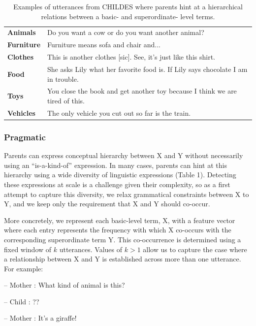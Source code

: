 \documentclass[10pt, letterpaper]{article}
\begin{document}
\begin{table}[t] \centering
\begin{tabular}{l p{}}
\hline
\textbf{Animals} & Do you want a cow or do you want another animal?\\
\textbf{Furniture} & Furniture means sofa and chair and...\\
\textbf{Clothes} & This is another clothes [sic]. See, it's just like this shirt.\\
\textbf{Food}   & She asks Lily what her favorite food is. If Lily says chocolate I am in trouble. \\
\textbf{Toys} & You close the book and get another toy because I think we are tired of this.\\
\textbf{Vehicles} & The only vehicle you cut out so far is the train.\\
\hline
\end{tabular}
\caption{\label{tab:pragmatic} Examples of utterances from CHILDES where parents hint at a hierarchical relations between a basic- and superordinate- level terms.}
\end{table}

\hypertarget{pragmatic}{%
\subsubsection{Pragmatic}\label{pragmatic}}

Parents can express conceptual hierarchy between X and Y without
necessarily using an ``is-a-kind-of'' expression. In many cases, parents
can hint at this hierarchy using a wide diversity of
linguistic expressions (Table 1). Detecting these expressions at scale is a challenge given their complexity, so as a first attempt to capture this diversity, we relax
grammatical constraints between X to Y, and we keep only the requirement
that X and Y should co-occur.

More concretely, we represent each basic-level term, X, with a feature
vector where each entry represents the frequency with which X co-occurs
with the corresponding superordinate term Y. This co-occurrence is
determined using a fixed window of \(k\) utterances. Values of \(k > 1\)
allow us to capture the case where a relationship between X and Y is
established across more than one utterance. For example:

-- Mother : What kind of animal is this?

-- Child : ??

-- Mother : It's a giraffe!
\end{document}
